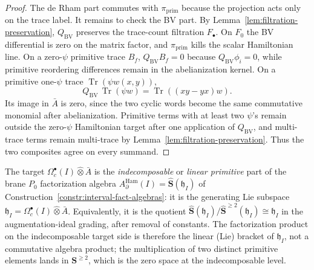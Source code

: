 \begin{proof}
  The de Rham part commutes with \(\pi_{\mathrm{prim}}\) because the
  projection acts only on the trace label.  It remains to check the BV
  part.  By Lemma~\ref{lem:filtration-preservation}, \(Q_{\mathrm{BV}}\)
  preserves the trace-count filtration \(F_\bullet\).  On \(F_0\) the BV
  differential is zero on the matrix factor, and \(\pi_{\mathrm{prim}}\)
  kills the scalar Hamiltonian line.  On a zero-\(\psi\) primitive trace
  \(B_f\), \(Q_{\mathrm{BV}}B_f=0\) because \(Q_{\mathrm{BV}}\phi_i=0\),
  while primitive reordering differences remain in the abelianization
  kernel.  On a primitive one-\(\psi\) trace
  \(\operatorname{Tr}(\psi w(x,y))\),
  \[
    Q_{\mathrm{BV}}\,\operatorname{Tr}(\psi w)
      =\operatorname{Tr}((xy-yx)w).
  \]
  Its image in \(\bar A\) is zero, since the two cyclic words become the
  same commutative monomial after abelianization.  Primitive terms with
  at least two \(\psi\)'s remain outside the zero-\(\psi\) Hamiltonian
  target after one application of \(Q_{\mathrm{BV}}\), and multi-trace
  terms remain multi-trace by Lemma~\ref{lem:filtration-preservation}.
  Thus the two composites agree on every summand.
\end{proof}

\begin{rmk}
  \label{rmk:primitive-target-indecomposable}
  The target
  $\Omega^\bullet_c(I)\widehat\otimes\bar A$ is the
  \emph{indecomposable} or \emph{linear primitive} part of the brane
  $P_0$ factorization algebra
  $A_\partial^{\mathrm{Ham}}(I)=\widehat{\mathbf S}(\mathfrak h_I)$
  of Construction~\ref{constr:interval-fact-algebras}: it is the
  generating Lie subspace
  $\mathfrak h_I=\Omega^\bullet_c(I)\widehat\otimes\bar A$.  Equivalently,
  it is the quotient
  $\widehat{\mathbf S}(\mathfrak h_I)/\widehat{\mathbf S}^{\geq 2}(\mathfrak h_I)
  \cong\mathfrak h_I$ in the augmentation-ideal grading, after
  removal of constants.  The factorization product on the indecomposable
  target side is therefore the linear (Lie) bracket of $\mathfrak h_I$,
  not a commutative algebra product; the multiplication of two
  distinct primitive elements lands in $\mathbf S^{\geq 2}$, which is
  the zero space at the indecomposable level.
\end{rmk}


